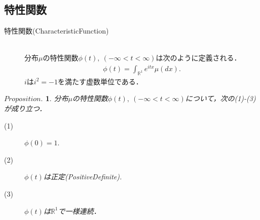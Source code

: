 \documentclass[a4j,papersize,disablejfam,slide,14pt]{jsarticle}
\newtheorem{Prop}{$Proposition.$}
\def\exp#1{e^{#1}} %
\begin{document}
\subsection{特性関数}
    \begin{screen}
    	\begin{description}
        	\item[特性関数({\rm Characteristic\quad Function})]\mbox{}\\
            	分布$\mu$の特性関数$\phi(t),\ (-\infty < t < \infty)$は次のように定義される．
                \begin{align}
            		\phi(t) = \int_{\mathbb{R}^1} \exp{itx} \mu(dx).
                \end{align}
                $i$は$i^2=-1$を満たす虚数単位である．
        \end{description}
    \end{screen}
    \begin{screen}
    	\begin{Prop}
        	分布$\mu$の特性関数$\phi(t),\ (-\infty < t < \infty)$について，次の(1)-(3)が成り立つ．
            \begin{description}
            	\item[(1)] $\phi(0) = 1.$
            	\item[(2)] $\phi(t)$は正定({\rm Positive\quad Definite}).
            	\item[(3)] $\phi(t)$は$\mathbb{R}^1$で一様連続．
            \end{description}
        \end{Prop}
    \end{screen}
\end{document}
